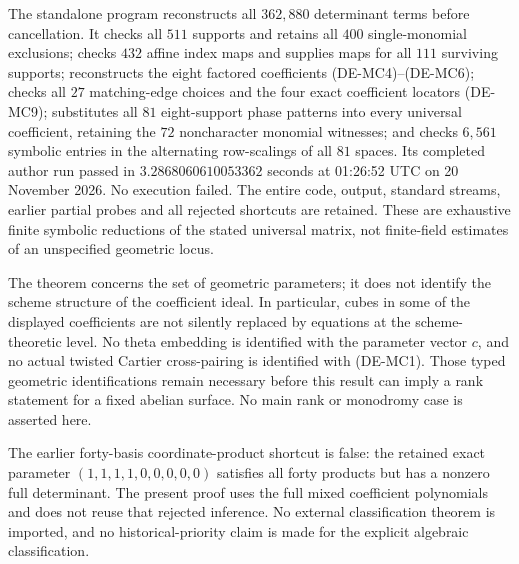 \begin{remark}
\label{rem:DE-Moore-classification-scope}
The standalone program
reconstructs all \(362{,}880\) determinant terms before cancellation.
It checks all \(511\) supports and retains all \(400\) single-monomial
exclusions; checks \(432\) affine index maps and supplies maps for
all \(111\) surviving supports; reconstructs the eight factored
coefficients (DE-MC4)--(DE-MC6); checks all \(27\) matching-edge
choices and the four exact coefficient locators (DE-MC9); substitutes all \(81\) eight-support phase patterns into
every universal coefficient, retaining the \(72\) noncharacter
monomial witnesses; and checks \(6{,}561\) symbolic entries in the
alternating row-scalings of all \(81\) spaces.  Its completed author
run passed in \(3.2868060610053362\) seconds at
01:26:52 UTC on 20 November 2026.  No execution failed.
The entire code, output, standard streams, earlier partial probes
and all rejected shortcuts are retained.  These are exhaustive
finite symbolic reductions of the stated universal matrix,
not finite-field estimates of an unspecified geometric locus.

The theorem concerns the set of geometric parameters; it does not
identify the scheme structure of the coefficient ideal.  In
particular, cubes in some of the displayed coefficients are not
silently replaced by equations at the scheme-theoretic level.
No theta embedding is identified with the parameter vector \(c\),
and no actual twisted Cartier cross-pairing is identified with
(DE-MC1).  Those typed geometric identifications remain necessary
before this result can imply a rank statement for a fixed abelian
surface.  No main rank or monodromy case is asserted here.

The earlier forty-basis coordinate-product shortcut is false:
the retained exact parameter \((1,1,1,1,0,0,0,0,0)\) satisfies
all forty products but has a nonzero full determinant.  The
present proof uses the full mixed coefficient polynomials and
does not reuse that rejected inference.  No external
classification theorem is imported, and no historical-priority
claim is made for the explicit algebraic classification.
\end{remark}
